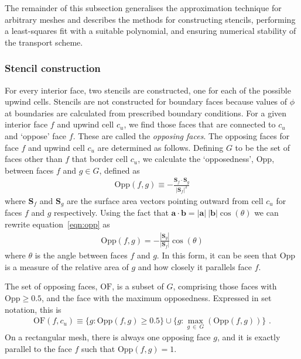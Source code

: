 The remainder of this subsection generalises the approximation technique for arbitrary meshes and describes the methods for constructing stencils, performing a least-squares fit with a suitable polynomial, and ensuring numerical stability of the transport scheme.

\subsubsection{Stencil construction}
For every interior face, two stencils are constructed, one for each of the possible upwind cells.
Stencils are not constructed for boundary faces because values of $\phi$ at boundaries are calculated from prescribed boundary conditions.
For a given interior face $f$ and upwind cell $c_u$, we find those faces that are connected to $c_u$ and `oppose' face $f$.  These are called the \textit{opposing faces}.
The opposing faces for face $f$ and upwind cell $c_u$ are determined as follows.
Defining $G$ to be the set of faces other than $f$ that border cell $c_u$, we calculate the `opposedness', $\mathrm{Opp}$, between faces $f$ and $g \in G$, defined as
\begin{align}
	\mathrm{Opp}(f, g) \equiv - \frac{\mathbf{S}_f \cdot \mathbf{S}_g}{|\mathbf{S}_f|^2} \label{eqn:opp}
\end{align}
where $\mathbf{S}_f$ and $\mathbf{S}_g$ are the surface area vectors pointing outward from cell $c_u$ for faces $f$ and $g$ respectively.
Using the fact that $\mathbf{a} \cdot \mathbf{b} = |\mathbf{a}|\:|\mathbf{b}| \cos(\theta)$ we can rewrite equation~\eqref{eqn:opp} as
\begin{align}
	\mathrm{Opp}(f, g) = - \frac{|\mathbf{S}_g|}{|\mathbf{S}_f|} \cos(\theta)
\end{align}
where $\theta$ is the angle between faces $f$ and $g$.  In this form, it can be seen that $\mathrm{Opp}$ is a measure of the relative area of $g$ and how closely it parallels face $f$.

The set of opposing faces, $\mathrm{OF}$, is a subset of $G$, comprising those faces with $\mathrm{Opp} \geq 0.5$, and the face with the maximum opposedness.  Expressed in set notation, this is
\begin{align}
	\mathrm{OF}(f,c_u) \equiv \{ g : \mathrm{Opp}(f, g) \geq 0.5 \} \cup \{ g : \max_{g\:\in\:G}(\mathrm{Opp}(f, g)) \} \text{ .}
\end{align}
On a rectangular mesh, there is always one opposing face $g$, and it is exactly parallel to the face $f$ such that $\mathrm{Opp}(f, g) = 1$.

